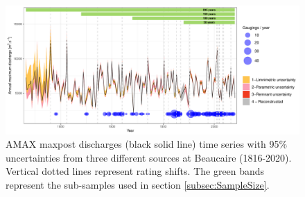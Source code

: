 \documentclass[11pt]{article}
\begin{document}
	
	
	
	
	\begin{figure}[h]
		\centering
		\includegraphics[width=1\linewidth]{Supplementary/IC_AMAX_Both_Bands.pdf}
	    \caption{AMAX maxpost discharges (black solid line) time series with 95\% uncertainties from three different sources at Beaucaire (1816-2020). Vertical dotted lines represent rating shifts. The green bands represent the sub-samples used in section \ref{subsec:SampleSize}.}
	    \label{fig:AMAX_Bands}
	\end{figure}
\end{document}
